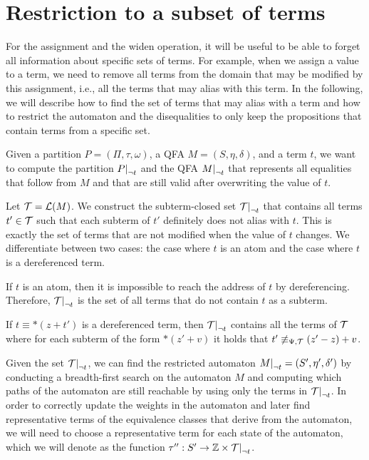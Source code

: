 \section{Restriction to a subset of terms}

For the assignment and the widen operation, it will be useful to be able to forget all information about specific sets of terms.
For example, when we assign a value to a term, we need to remove all terms from the domain that may be modified by this assignment, i.e., all the terms that may alias with this term.
In the following, we will describe how to find the set of terms that may alias with a term and how to restrict the automaton and the disequalities to only keep the propositions that contain terms from a specific set.

Given a partition $P = (\Pi, \tau, \omega)$, a QFA $M = (S, \eta, \delta)$, and a term $t$, we want to compute the partition $\restr{P}{\neg t}$ and the QFA $\restr{M}{\neg t}$ that represents all equalities that follow from $M$ and that are still valid after overwriting the value of $t$.

Let $\mathcal{T} = \mathcal{L}(M)$. We construct the subterm-closed set $\restr{\T}{\neg t}$ that contains all terms $t' \in \mathcal{T}$ such that each subterm of $t'$ definitely does not alias with $t$.
This is exactly the set of terms that are not modified when the value of $t$ changes.
We differentiate between two cases: the case where $t$ is an atom and the case where $t$ is a dereferenced term.

If $t$ is an atom, then it is impossible to reach the address of $t$ by dereferencing.
Therefore, $\restr{\T}{\neg t}$ is the set of all terms that do not contain $t$ as a subterm.

If $t \equiv *(z + t')$ is a dereferenced term, then $\restr{\T}{\neg t}$ contains all the terms of $\mathcal{T}$ where for each subterm of the form $*(z' + v)$ it holds that $t' \not\equiv_{\Psi,\mathcal{T}} (z' - z) + v$.

Given the set $\restr{\T}{\neg t}$, we can find the restricted automaton $\restr{M}{\neg t} = (S', \eta', \delta')$ by conducting a breadth-first search on the automaton $M$ and computing which paths of the automaton are still reachable by using only the terms in $\restr{\T}{\neg t}$.
In order to correctly update the weights in the automaton and later find representative terms of the equivalence classes that derive from the automaton, we will need to choose a representative term for each state of the automaton, which we will denote as the function $\repr : S' \rightarrow \Z \times \restr{\T}{\neg t}$.

